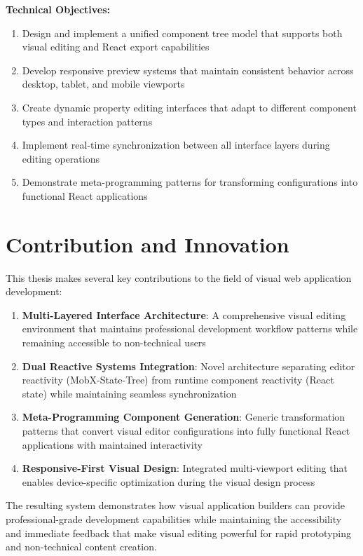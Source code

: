 \documentclass[oneside,11pt]{book}
\begin{document}
\textbf{Technical Objectives:}

\begin{enumerate}
    \item Design and implement a unified component tree model that supports both visual editing and React export capabilities
    \item Develop responsive preview systems that maintain consistent behavior across desktop, tablet, and mobile viewports
    \item Create dynamic property editing interfaces that adapt to different component types and interaction patterns
    \item Implement real-time synchronization between all interface layers during editing operations
    \item Demonstrate meta-programming patterns for transforming configurations into functional React applications
\end{enumerate}

\section{Contribution and Innovation}
\label{sec:contribution}

This thesis makes several key contributions to the field of visual web application development:

\begin{enumerate}
    \item \textbf{Multi-Layered Interface Architecture}: A comprehensive visual editing environment that maintains professional development workflow patterns while remaining accessible to non-technical users
    
    \item \textbf{Dual Reactive Systems Integration}: Novel architecture separating editor reactivity (MobX-State-Tree) from runtime component reactivity (React state) while maintaining seamless synchronization
    
    \item \textbf{Meta-Programming Component Generation}: Generic transformation patterns that convert visual editor configurations into fully functional React applications with maintained interactivity
    
    \item \textbf{Responsive-First Visual Design}: Integrated multi-viewport editing that enables device-specific optimization during the visual design process
\end{enumerate}

The resulting system demonstrates how visual application builders can provide professional-grade development capabilities while maintaining the accessibility and immediate feedback that make visual editing powerful for rapid prototyping and non-technical content creation.

\printbibliography

\printglossaries
\end{document}
